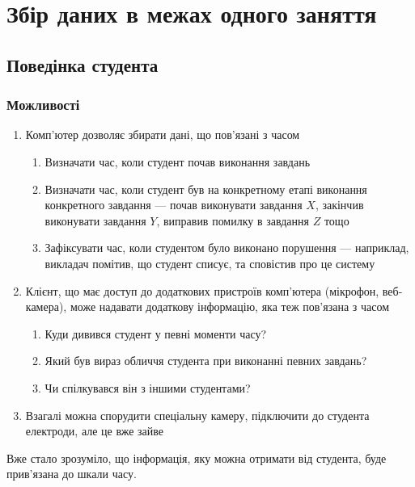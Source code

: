 \chapter{Збір даних в межах одного заняття}

\section{Поведінка студента}

\subsection{Можливості}

\begin{enumerate}
  \item
    Комп’ютер дозволяє збирати дані, що пов’язані з часом
    \begin{enumerate}
      \item
        Визначати час, коли студент почав виконання завдань
      \item
        Визначати час, коли студент був на конкретному етапі виконання
        конкретного завдання --- почав виконувати завдання $X$, закінчив
        виконувати завдання $Y$, виправив помилку в завдання $Z$ тощо
      \item
        Зафіксувати час, коли студентом було виконано порушення ---
        наприклад, викладач помітив, що студент списує, та сповістив про це
        систему
    \end{enumerate}
  \item
    Клієнт, що має доступ до додаткових пристроїв комп’ютера (мікрофон,
    веб-камера), може надавати додаткову інформацію, яка теж пов’язана з
    часом
    \begin{enumerate}
      \item
        Куди дивився студент у певні моменти часу?
      \item
        Який був вираз обличчя студента при виконанні певних завдань?
      \item
        Чи спілкувався він з іншими студентами?
    \end{enumerate}
  \item
    Взагалі можна спорудити спеціальну камеру, підключити до студента
    електроди, але це вже зайве
\end{enumerate}

Вже стало зрозуміло, що інформація, яку можна отримати від студента, буде
прив’язана до шкали часу.


